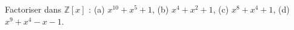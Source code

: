Factoriser dans $\mathbb{Z}[x]$ : (a) $x^{10} + x^5 + 1$, (b) $x^4 + x^2 + 1$, (c) $x^8 + x^4 + 1$, (d) $x^9 + x^4 - x - 1$.
